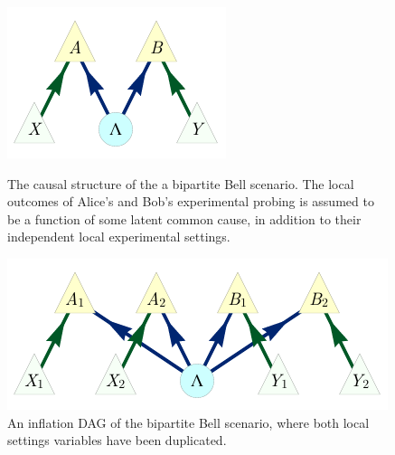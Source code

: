 \begin{figure}[ht]
\centering
\begin{minipage}[t]{0.45\linewidth}
\centering
\includegraphics[scale=1]{BellDagRaw.pdf}
\caption{The causal structure of the a bipartite Bell scenario. The local outcomes of Alice's and Bob's experimental probing is assumed to be a function of some latent common cause, in addition to their independent local experimental settings.}\label{fig:NewBellDAG1}
\end{minipage}
\hfill
\begin{minipage}[t]{0.45\linewidth}
\centering
\includegraphics[scale=1]{BellDagCopy.pdf}
\caption{An inflation DAG of the bipartite Bell scenario, where both local settings variables have been duplicated.}\label{fig:BellDagCopy1}
\end{minipage}
\end{figure}


